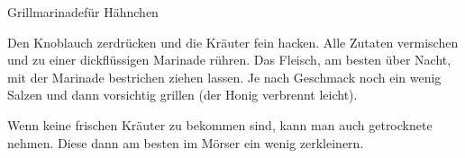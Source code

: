 \begin{recipe}{Grillmarinade}{für Hähnchen}
  \label{Marinade}
  \inglist

  \steps
  Den Knoblauch zerdrücken und die Kräuter fein hacken. Alle Zutaten vermischen
  und zu einer dickflüssigen Marinade rühren. Das Fleisch, am besten über Nacht,
  mit der Marinade bestrichen ziehen lassen. Je nach Geschmack noch ein wenig
  Salzen und dann vorsichtig grillen (der Honig verbrennt leicht).

  Wenn keine frischen Kräuter zu bekommen sind, kann man auch getrocknete
  nehmen. Diese dann am besten im Mörser ein wenig zerkleinern.
\end{recipe}
